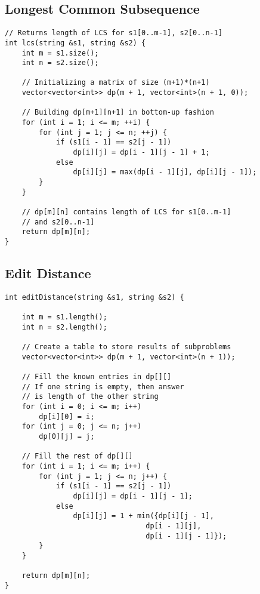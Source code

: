 \documentclass[10pt]{article}
\begin{document}
\begin{multicols*}{2}
\subsection{Longest Common Subsequence}

\begin{lstlisting}[style=compactcpp]
// Returns length of LCS for s1[0..m-1], s2[0..n-1]
int lcs(string &s1, string &s2) {
    int m = s1.size();
    int n = s2.size();

    // Initializing a matrix of size (m+1)*(n+1)
    vector<vector<int>> dp(m + 1, vector<int>(n + 1, 0));

    // Building dp[m+1][n+1] in bottom-up fashion
    for (int i = 1; i <= m; ++i) {
        for (int j = 1; j <= n; ++j) {
            if (s1[i - 1] == s2[j - 1])
                dp[i][j] = dp[i - 1][j - 1] + 1;
            else
                dp[i][j] = max(dp[i - 1][j], dp[i][j - 1]);
        }
    }

    // dp[m][n] contains length of LCS for s1[0..m-1]
    // and s2[0..n-1]
    return dp[m][n];
}

\end{lstlisting}

\subsection{Edit Distance}

\begin{lstlisting}[style=compactcpp]
int editDistance(string &s1, string &s2) {
  
    int m = s1.length();
    int n = s2.length();

    // Create a table to store results of subproblems
    vector<vector<int>> dp(m + 1, vector<int>(n + 1));

    // Fill the known entries in dp[][]
    // If one string is empty, then answer 
    // is length of the other string
    for (int i = 0; i <= m; i++) 
        dp[i][0] = i;
    for (int j = 0; j <= n; j++) 
        dp[0][j] = j; 

    // Fill the rest of dp[][]
    for (int i = 1; i <= m; i++) {
        for (int j = 1; j <= n; j++) {
            if (s1[i - 1] == s2[j - 1])
                dp[i][j] = dp[i - 1][j - 1];
            else
                dp[i][j] = 1 + min({dp[i][j - 1],  
                                 dp[i - 1][j],   
                                 dp[i - 1][j - 1]});
        }
    }

    return dp[m][n];
} 
\end{lstlisting}


\end{multicols*}
\end{document}
